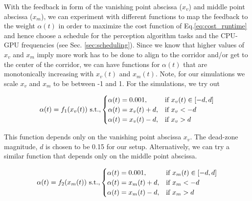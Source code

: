 With the feedback in form of the vanishing point abscissa ($x_v$) and middle point abscissa ($x_m$), we can experiment with different functions to map the feedback to the weight $\alpha(t)$ in order to maximize the cost function of Eq.\ref{eq:cost_runtime} and hence choose a schedule for the perception algorithm tasks and the CPU-GPU frequencies (see Sec. \ref{sec:scheduling}). 
Since we know that higher values of $x_v$ and $x_m$ imply more work has to be done to align to the corridor and/or get to the center of the corridor, we can have functions for $\alpha(t)$ that are monotonically increasing with $x_v(t)$ and $x_m(t)$. Note, for our simulations we scale $x_v$ and $x_m$ to be between -1 and 1. For the simulations, we try out

{\footnotesize{
\begin{equation}
\alpha(t) = f_1(x_v(t)) \text{ s.t.,} \\
\begin{cases}
\alpha(t) = 0.001,&\text{if }x_v(t)\in[-d,d]\\
\alpha(t) = x_v(t)+d,&\text{if }x_v<-d\\
\alpha(t) = x_v(t)-d,&\text{if }x_v>d
\end{cases}
\label{eq:f1}
\end{equation}
}}


This function depends only on the vanishing point abscissa $x_v$. The dead-zone magnitude, $d$ is chosen to be 0.15 for our setup. Alternatively, we can try a similar function that depends only on the middle point abscissa.

\footnotesize{
\begin{equation}
\alpha(t) = f_2(x_m(t)) \text{ s.t.,} \\
\begin{cases}
\alpha(t) = 0.001,&\text{if }x_m(t)\in[-d,d]\\
\alpha(t) = x_m(t)+d,&\text{if }x_m<-d\\
\alpha(t) = x_m(t)-d,&\text{if }x_m>d
\end{cases}
\label{eq:f2}
\end{equation}
}








